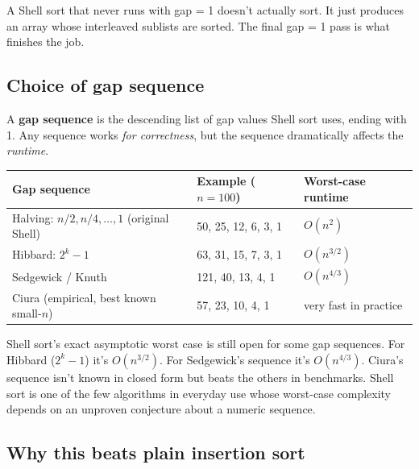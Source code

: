 \documentclass[11pt]{article}
\begin{document}
\begin{warnbox}
A Shell sort that never runs with gap = 1 doesn't actually sort.
It just produces an array whose interleaved sublists are sorted.
The final gap = 1 pass is what finishes the job.
\end{warnbox}

\subsection{Choice of gap sequence}

\begin{defnbox}
A \textbf{gap sequence} is the descending list of gap values Shell
sort uses, ending with 1. Any sequence works \emph{for correctness},
but the sequence dramatically affects the \emph{runtime}.
\end{defnbox}

\begin{center}
\footnotesize
\renewcommand{\arraystretch}{1.25}
\begin{tabular}{@{}p{4.5cm}p{4cm}p{4.5cm}@{}}
\hline
\textbf{Gap sequence}        & \textbf{Example ($n=100$)}       & \textbf{Worst-case runtime} \\
\hline
Halving: $n/2, n/4, \ldots, 1$ (original Shell) & 50, 25, 12, 6, 3, 1 & $O(n^2)$ \\
Hibbard: $2^k - 1$           & 63, 31, 15, 7, 3, 1              & $O(n^{3/2})$ \\
Sedgewick / Knuth            & 121, 40, 13, 4, 1                & $O(n^{4/3})$ \\
Ciura (empirical, best known small-$n$) & 57, 23, 10, 4, 1        & very fast in practice \\
\hline
\end{tabular}
\end{center}

\begin{ideabox}
Shell sort's exact asymptotic worst case is still open for some gap
sequences. For Hibbard ($2^k - 1$) it's $O(n^{3/2})$. For
Sedgewick's sequence it's $O(n^{4/3})$. Ciura's sequence isn't known
in closed form but beats the others in benchmarks. Shell sort is
one of the few algorithms in everyday use whose worst-case complexity
depends on an unproven conjecture about a numeric sequence.
\end{ideabox}

\subsection{Why this beats plain insertion sort}
\end{document}
